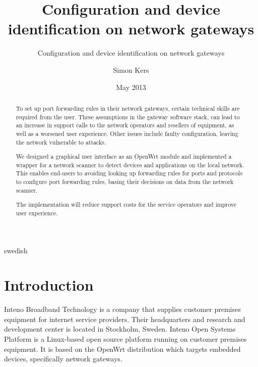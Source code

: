 \documentclass[a4paper,11pt]{kth-mag}
\title{Configuration and device identification on network gateways}
\subtitle{Configuration and device identification on network gateways}
\author{Simon Kers}
\date{May 2013}
\newcommand\blankpage{%
    \null
    \thispagestyle{empty}%
    \addtocounter{page}{-1}%
    \newpage}
\begin{document}
\frontmatter
{}
\setcounter{page}{3}
\pagestyle{center}

\maketitle
\thispagestyle{center}
\begin{abstract}
To set up port forwarding rules in their network gateways, certain technical skills are required from the user.
These assumptions in the gateway software stack, can lead to an increase in support calls to the network operators and resellers of equipment, as well as a worsened user experience.
Other issues include faulty configuration, leaving the network vulnerable to attacks.

We designed a graphical user interface as an OpenWrt module and implemented a wrapper for a network scanner to detect devices and applications on the local network.
This enables end-users to avoiding looking up forwarding rules for ports and protocols to configure port forwarding rules, basing their decisions on data from the network scanner.

The implementation will reduce support costs for the service operators and improve user experience.

\end{abstract}
\newpage
\blankpage

\begin{foreignabstract}{swedish}

\newpage
\blankpage

\end{foreignabstract}
\clearpage
\tableofcontents*
\mainmatter
\pagestyle{newchap}
\chapter{Introduction}
Inteno Broadband Technology is a company that supplies customer premises equipment for internet service providers.  
Their headquarters and research and development center is located in Stockholm, Sweden.
Inteno Open Systems Platform is a Linux-based open source platform running on customer premises equipment.
It is based on the OpenWrt distribution which targets embedded devices, specifically network gateways. \cite{Inteno}
\end{document}
